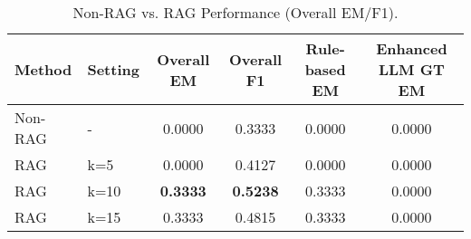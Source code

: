 \begin{table}[t]
\centering
\caption{Non-RAG vs. RAG Performance (Overall EM/F1).}
\label{tab:rag_nonrag_results}
\begin{tabular}{llcccc}
\hline
Method & Setting & Overall EM & Overall F1 & Rule-based EM & Enhanced LLM GT EM \\ 
\hline
Non-RAG & - & 0.0000 & 0.3333 & 0.0000 & 0.0000 \\
RAG & k=5 & 0.0000 & 0.4127 & 0.0000 & 0.0000 \\
RAG & k=10 & \textbf{0.3333} & \textbf{0.5238} & 0.3333 & 0.0000 \\
RAG & k=15 & 0.3333 & 0.4815 & 0.3333 & 0.0000 \\
\hline
\end{tabular}
\end{table}
